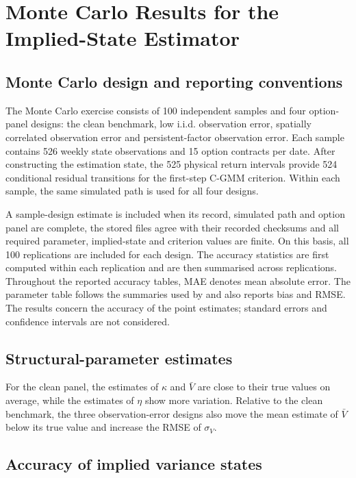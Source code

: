\documentclass[11pt,a4paper,notitlepage]{article}
\numberwithin{equation}{section}
\begin{document}
\section{Monte Carlo Results for the Implied-State Estimator}
\label{sec:is_cgmm_results}

\subsection{Monte Carlo design and reporting conventions}

The Monte Carlo exercise consists of 100 independent samples and four option-panel designs: the clean benchmark, low i.i.d. observation error, spatially correlated observation error and persistent-factor observation error. Each sample contains 526 weekly state observations and 15 option contracts per date. After constructing the estimation state, the 525 physical return intervals provide 524 conditional residual transitions for the first-step C-GMM criterion. Within each sample, the same simulated path is used for all four designs.

A sample-design estimate is included when its record, simulated path and option panel are complete, the stored files agree with their recorded checksums and all required parameter, implied-state and criterion values are finite. On this basis, all 100 replications are included for each design. The accuracy statistics are first computed within each replication and are then summarised across replications. Throughout the reported accuracy tables, MAE denotes mean absolute error. The parameter table follows the summaries used by \citet{boswijk2024estimating} and also reports bias and RMSE. The results concern the accuracy of the point estimates; standard errors and confidence intervals are not considered.

\subsection{Structural-parameter estimates}



For the clean panel, the estimates of $\kappa$ and $\bar V$ are close to their true values on average, while the estimates of $\eta$ show more variation. Relative to the clean benchmark, the three observation-error designs also move the mean estimate of $\bar V$ below its true value and increase the RMSE of $\sigma_V$.

\subsection{Accuracy of implied variance states}
\end{document}
